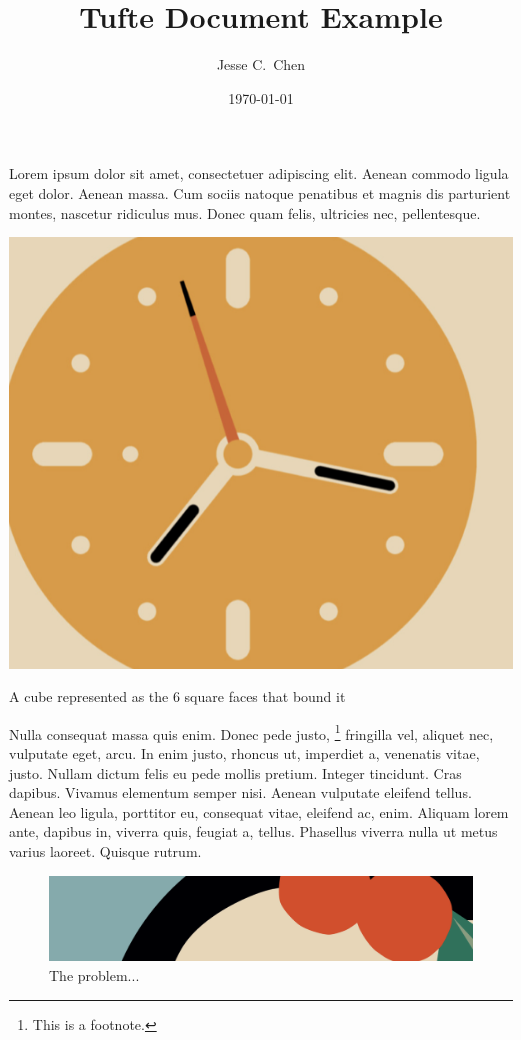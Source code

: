 \documentclass[a4paper]{article}
\title{Tufte Document Example}
\author{Jesse C.\ Chen}
\date{\today}
\begin{document}
\maketitle

\noindent
Lorem ipsum dolor sit amet, consectetuer adipiscing elit. Aenean commodo ligula
eget dolor. Aenean massa. Cum sociis natoque penatibus et magnis dis parturient
montes, nascetur ridiculus mus. Donec quam felis, ultricies nec, pellentesque.

\begin{marginfigure}
	\includegraphics[width=\marginparwidth]{test-1.png}
	\caption{A cube represented as the 6 square faces that bound it}
	\label{fig:brep}
\end{marginfigure}

Nulla consequat massa quis enim. Donec pede justo,
\footnote{\label{foot:first}
	This is a footnote.
}
fringilla vel, aliquet nec, vulputate eget, arcu. In enim justo, rhoncus ut,
imperdiet a, venenatis vitae, justo. Nullam dictum felis eu pede mollis
pretium. Integer tincidunt. Cras dapibus. Vivamus elementum semper nisi. Aenean
vulputate eleifend tellus. Aenean leo ligula, porttitor eu, consequat vitae,
eleifend ac, enim. Aliquam lorem ante, dapibus in, viverra quis, feugiat a,
tellus. Phasellus viverra nulla ut metus varius laoreet. Quisque rutrum.

\begin{figure}[t!]
	\centering
	\includegraphics[width=\linewidth]{test-2.png}
	\caption{The problem...}
	\label{fig:konigsberg}
\end{figure}
\end{document}
